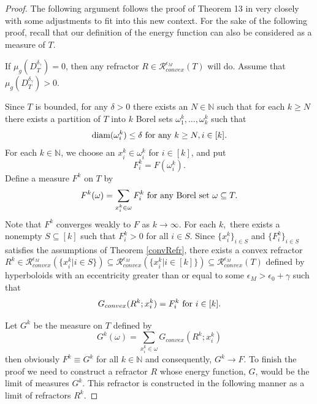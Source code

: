 \documentclass[review]{elsarticle}
\begin{document}
\begin{proof}
The following argument follows the proof of Theorem 13 in \cite{KOT} very closely with some adjustments to fit into this new context. For the sake of the following proof, recall that our definition of the energy function can also be considered as a measure of $T$.

If $\mu_g(D_T^{\delta_\gamma})=0$, then any refractor $R \in \mathcal{R}_{convex}^{\epsilon_M} (T)$ will do. Assume that $\mu_g(D_T^{\delta_\gamma})>0$.

Since $T$ is bounded, for any $\delta > 0$ there exists an $N\in \mathbb{N}$ such that for each $k\ge N$ there exists a partition of $T$ into $k$ Borel sets $\omega_1^k,\dots,\omega_k^k$ such that
\begin{equation}
    \textnormal{diam}(\omega_i^k)\le \delta \textnormal{ for any } k \ge N, i\in[k].
\end{equation}
For each $k \in \mathbb{N}$, we choose an $x_i^k\in \omega_i^k$ for $i \in [k]$, and put
\begin{equation}
    F_i^k=F(\omega_i^k).
\end{equation}
Define a measure $F^k$ on $T$ by
\begin{equation}
    F^k(\omega)=\sum_{x_i^k\in\omega}F_i^k \textnormal{ for any Borel set } \omega \subseteq T.
\end{equation}
Note that $F^k$ converges weakly to $F$ as $k \to \infty.$ For each $k,$ there exists a nonempty $S\subseteq[k]$ such that $F_i^k>0$ for all $i\in S$. Since $\{x_i^k\}_{i\in S}$ and $\{F_i^k\}_{i\in S}$ satisfies the assumptions of Theorem \ref{convRefr}, there exists a convex refractor $R^k\in \mathcal{R}_{convex}^{\epsilon_M}(\{x_i^k|i\in S\})\subseteq\mathcal{R}_{convex}^{\epsilon_M}(\{x_i^k|i\in [k]\})\subseteq \mathcal{R}_{convex}^{\epsilon_M}(T)$ defined by hyperboloids with an eccentricity greater than or equal to some $\epsilon_M>\epsilon_0+\gamma$ such that
\begin{equation}
    G_{convex}(R^k;x_i^k ) = F_i^k \textnormal{ for } i \in[k].
\end{equation}

Let $G^k$ be the measure on $T$ defined by
\begin{equation}
    G^k(\omega) =\sum_{x_i^k\in \omega}G_{convex}(R^k;x_i^k ) 
\end{equation}
then obviously $F^k \equiv G^k$ for all $k\in \mathbb{N}$ and consequently, $G^k \to F$. To finish the
proof we need to construct a refractor $R$ whose energy function, $G$, would be the limit of measures $G^k$. This refractor is constructed in the following manner as a limit of refractors $R^k$.


\end{proof}
\end{document}
